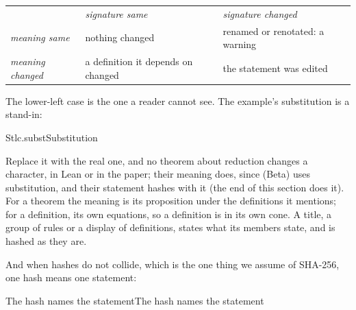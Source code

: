 \documentclass[acmsmall,screen,review,anonymous,nonacm]{acmart}
\begin{document}
\begin{center}\small
\begin{tabular}{l@{\quad}p{3.6cm}@{\quad}p{3.6cm}}
 & \textit{signature same} & \textit{signature changed} \\[2pt]
\textit{meaning same} & nothing changed & renamed or renotated: a warning \\[2pt]
\textit{meaning changed} & a definition it depends on changed & the statement was edited \\
\end{tabular}
\end{center}

The lower-left case is the one a reader cannot see. The example's
substitution is a stand-in:

\begin{leandef}[sum=dLUGSgMoci, dflt=RtBzK4zyFz]{Stlc.subst}{Substitution}
\begin{LeanDisplay}
\end{LeanDisplay}
\end{leandef}

Replace it with the real one, and no theorem about reduction changes a
character, in Lean or in the paper; their meaning does, since (Beta) uses
substitution, and their statement hashes with it (the end of this section does it). For a theorem the meaning is its proposition under the
definitions it mentions; for a definition, its own equations, so a
definition is in its own cone. A title, a group of rules or a display of
definitions, states what its members state, and is hashed as they are.

And when hashes do not collide, which is the one thing we assume of SHA-256,
one hash means one statement:

\begin{leantheorem}[sum=62mT9X28I5]{The hash names the statement}{The hash names the statement}
\label{thm:The-hash-names-the-statement}
\end{leantheorem}
\end{document}
